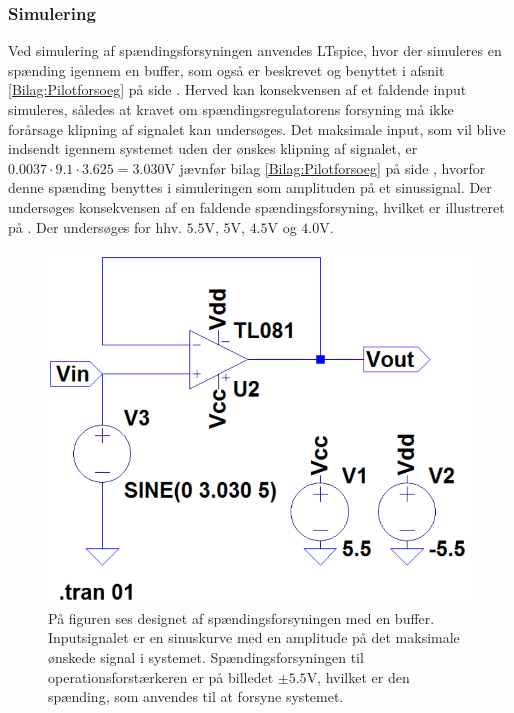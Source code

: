 \subsubsection{Simulering}
Ved simulering af spændingsforsyningen anvendes LTspice, hvor der simuleres en spænding igennem en buffer, som også er beskrevet og benyttet i afsnit \ref{Bilag:Pilotforsoeg} på side \pageref{Bilag:Pilotforsoeg}. Herved kan konsekvensen af et faldende input simuleres, således at kravet om spændingsregulatorens forsyning må ikke forårsage klipning af signalet kan undersøges. Det maksimale input, som vil blive indsendt igennem systemet uden der ønskes klipning af signalet, er $0.0037 \cdot 9.1 \cdot 3.6 25 = 3.030$V jævnfør bilag \ref{Bilag:Pilotforsoeg} på side \pageref{Bilag:Pilotforsoeg}, hvorfor denne spænding benyttes i simuleringen som amplituden på et sinussignal. Der undersøges konsekvensen af en faldende spændingsforsyning, hvilket er illustreret på . Der undersøges for hhv. $5.5$V, $5$V, $4.5$V og $4.0$V.
\begin{figure}[H]
	\centering
	\includegraphics[scale=0.4]{figures/cProblemloesning/Spaendingsforsyning_LTspice2.PNG}
	\caption{På figuren ses designet af spændingsforsyningen med en buffer. Inputsignalet er en sinuskurve med en amplitude på det maksimale ønskede signal i systemet. Spændingsforsyningen til operationsforstærkeren er på billedet $\pm5.5$V, hvilket er den spænding, som anvendes til at forsyne systemet.}
	\label{fig:spaendingsforsyning}
\end{figure}
